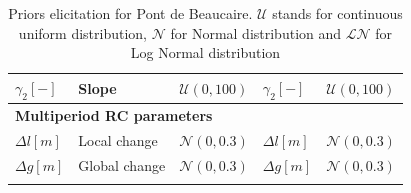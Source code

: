 \documentclass[11pt]{article}
\begin{document}
\begin{table}[h!]
\begin{tabular}{|l|l|l|l|l|}
            $\gamma_{2} [-]$ & Slope & $\mathcal{U}(0,100)$ & $\gamma_{2} [-]$ &$\mathcal{U}(0,100)$  \\
            \hline
            \multicolumn{5}{|l|}{\textbf{Multiperiod RC parameters}} \\
            $\Delta l [m]$     &   Local change    &  $\mathcal{N}(0,0.3)$&      $\Delta l [m]$     &$\mathcal{N}(0,0.3)$\\
            $\Delta g [m]$     &   Global change       &  $\mathcal{N}(0,0.3)$&      $\Delta g [m]$     &$\mathcal{N}(0,0.3)$\\
            \lasthline
            \end{tabular} 
            \caption{Priors elicitation for Pont de Beaucaire. $\mathcal{U}$ stands for continuous uniform distribution, $\mathcal{N}$ for Normal distribution and $\mathcal{LN}$ for Log Normal distribution}
            \label{tab:PriorPt}
       \end{table}
       
    
\end{document}
